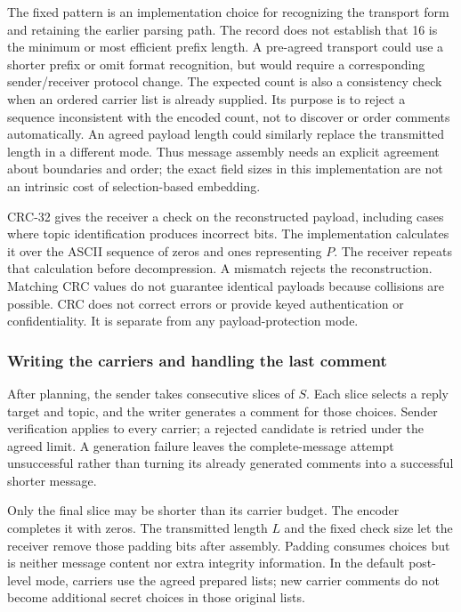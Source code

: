 The fixed pattern is an implementation choice for recognizing the transport form and retaining the earlier parsing path. The record does not establish that 16 is the minimum or most efficient prefix length. A pre-agreed transport could use a shorter prefix or omit format recognition, but would require a corresponding sender/receiver protocol change. The expected count is also a consistency check when an ordered carrier list is already supplied. Its purpose is to reject a sequence inconsistent with the encoded count, not to discover or order comments automatically. An agreed payload length could similarly replace the transmitted length in a different mode. Thus message assembly needs an explicit agreement about boundaries and order; the exact field sizes in this implementation are not an intrinsic cost of selection-based embedding.

CRC-32 gives the receiver a check on the reconstructed payload, including cases where topic identification produces incorrect bits. The implementation calculates it over the ASCII sequence of zeros and ones representing $P$. The receiver repeats that calculation before decompression. A mismatch rejects the reconstruction. Matching CRC values do not guarantee identical payloads because collisions are possible. CRC does not correct errors or provide keyed authentication or confidentiality. It is separate from any payload-protection mode.

\subsubsection{Writing the carriers and handling the last comment}
After planning, the sender takes consecutive slices of $S$. Each slice selects a reply target and topic, and the writer generates a comment for those choices. Sender verification applies to every carrier; a rejected candidate is retried under the agreed limit. A generation failure leaves the complete-message attempt unsuccessful rather than turning its already generated comments into a successful shorter message.

Only the final slice may be shorter than its carrier budget. The encoder completes it with zeros. The transmitted length $L$ and the fixed check size let the receiver remove those padding bits after assembly. Padding consumes choices but is neither message content nor extra integrity information. In the default post-level mode, carriers use the agreed prepared lists; new carrier comments do not become additional secret choices in those original lists.

